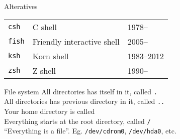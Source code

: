 \documentclass{beamer}
\let\tt\texttt
\begin{document}
\begin{frame}{Alteratives}
        \begin{tabular}{p{} p{} p{}}
                \tt{csh}        & C shell   & 1978--  \\
                \tt{fish}       & Friendly interactive shell &  2005-- \\
                \tt{ksh}        & Korn shell & 1983--2012 \\
                \tt{zsh}        & Z shell & 1990--  \\
        \end{tabular}
\end{frame}

\begin{frame}{File system}
        All directories has itself in it, called \tt{.}                \\
        All directories has previous directory in it, called \tt{..}   \\
        Your home directory is called \tt{~}                           \\
        Everything starts at the root directory, called \tt{/}         \\
        ``Everything is a file''. Eg. \tt{/dev/cdrom0}, \tt{/dev/hda0}, etc.
\end{frame}
\end{document}

